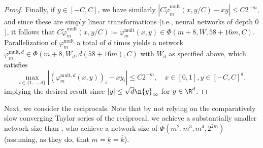 \documentclass[a4paper, 11pt, headings = small, abstract]{scrartcl}
\begin{document}
\begin{proof}
    Finally, if $y\in[-C, C]$, we have similarly $|C\widetilde{\varphi}_m^{\mathrm{mult}}(x, y/C)-xy|\le C2^{-m}$, and since these are simply linear transformations (i.e., neural networks of depth $0$), it follows that $C\widetilde{\varphi}_m^{\mathrm{mult}}(x, y/C)\coloneqq\varphi_m^{\mathrm{mult}}(x, y)\in\Phi(m+8, W, 58+16m, C)$.
    Parallelization of $\varphi_m^{\mathrm{mult}}$ a total of $d$ times yields a network $\varphi_m^{{\mathrm{mult}}, d}\in\Phi(m+8, W_d, d(58+16m), C)$ with $W_d$ as specified above, which satisfies
    \[
        \max_{i\in\{1, \ldots, d\}}|(\varphi_m^{{\mathrm{mult}}, d}(x, y))_i-xy_i|\le C2^{-m},\quad x\in[0, 1],y\in[-C, C]^d,
    \]
    implying the desired result since $|y|\le\sqrt{d}\n{y}_\infty$ for $y\in\R^d$.
    \end{proof}

Next, we consider the reciprocals.
Note that by not relying on the comparatively slow converging Taylor series of the reciprocal, we achieve a substantially smaller network size than \cite[Lemma F.7]{oko23}, who achieve a network size of $\widetilde{\Phi}(m^2, m^3, m^4, 2^{2m})$ (assuming, as they do, that $m=\underline{k}=\overline{k}$).
\end{document}
